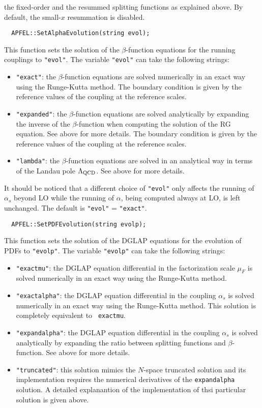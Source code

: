\documentclass[11pt,a4paper]{article}
\begin{document}
  the fixed-order and the resummed splitting functions as explained
  above. By default, the small-$x$ resummation is disabled.
\begin{lstlisting}
  APFEL::SetAlphaEvolution(string evol);
\end{lstlisting}
This function sets the solution of the $\beta$-function equations for
the running couplings to {\tt "evol"}. The variable {\tt "evol"} can
take the following strings:
\begin{itemize}
\item {\tt "exact"}: the $\beta$-function equations are solved
  numerically in an exact way using the Runge-Kutta method. The
  boundary condition is given by the reference values of the coupling
  at the reference scales.
\item {\tt "expanded"}: the $\beta$-function equations are solved
  analytically by expanding the inverse of the $\beta$-function when
  computing the solution of the RG equation. See above for more
  details. The boundary condition is given by the reference values of
  the coupling at the reference scales.
\item {\tt "lambda"}: the $\beta$-function equations are solved in an
  analytical way in terms of the Landau pole $\Lambda_{\rm QCD}$. See
  above for more details.
\end{itemize}
It should be noticed that a different choice of {\tt "evol"} only
affects the running of $\alpha_s$ beyond LO while the running of
$\alpha$, being computed always at LO, is left unchanged. The default
is {\tt "evol"} = {\tt "exact"}.
\begin{lstlisting}
  APFEL::SetPDFEvolution(string evolp);
\end{lstlisting}
This function sets the solution of the DGLAP equations for the
evolution of PDFs to {\tt "evolp"}. The variable {\tt "evolp"} can
take the following strings:
\begin{itemize}
\item {\tt "exactmu"}: the DGLAP equation differential in the
  factorization scale $\mu_F$ is solved numerically in an exact way
  using the Runge-Kutta method.
\item {\tt "exactalpha"}: the DGLAP equation differential in the
  coupling $\alpha_s$ is solved numerically in an exact way using the
  Runge-Kutta method. This solution is completely equivalent to {\tt
    exactmu}.
\item {\tt "expandalpha"}: the DGLAP equation differential in the
  coupling $\alpha_s$ is solved analytically by expanding the ratio
  between splitting functions and $\beta$-function. See above for more
  details.
\item {\tt "truncated"}: this solution mimics the $N$-space truncated
  solution and its implementation requires the numerical derivatives
  of the {\tt expandalpha} solution. A detailed explanantion of the
  implementation of thsi particular solution is given above.
\end{itemize}
\end{document}
